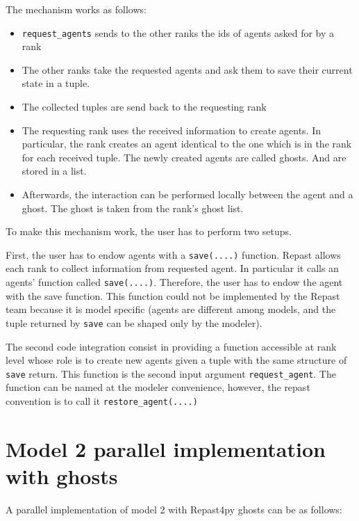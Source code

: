 \documentclass{article}
\providecommand{\tightlist}{%
  \setlength{\itemsep}{0pt}\setlength{\parskip}{0pt}}
\begin{document}
The mechanism works as follows:

\begin{itemize}
	\tightlist
	\item 
\verb+request_agents+ sends to the other ranks the ids of agents asked for by a rank
	\item 
The other ranks take the requested agents and ask them to save their current state in a tuple.
	\item 
The collected tuples are send back to the requesting rank
	\item 
		The requesting rank uses the received information to create agents. In particular, the rank creates an agent identical to the one which is in the rank for each received tuple. The newly created agents are called ghosts. And are stored in a list.
	\item 
		Afterwards, the interaction can be performed locally between the agent and a ghost. The ghost is taken from the rank's ghost list.
\end{itemize}

To make this mechanism work, the user has to perform two setups.

First, the user has to endow agents with a \verb+save(....)+ function.
Repast allows each rank to collect information from requested agent. In particular it calls an agents' function called \verb+save(....)+.
Therefore, the user has to endow the agent with the save function. This function could not be implemented by the Repast team because it is model specific (agents are different among models, and the tuple returned by \verb+save+ can be shaped only by the modeler).

The second code integration consist in providing a function accessible at rank level whose role is to create new agents given a tuple with the same structure of \verb+save+ return. This function is the second input argument \verb+request_agent+. The function can be named at the modeler convenience, however, the repast convention is to call it \verb+restore_agent(....)+   


\section{Model 2 parallel implementation with ghosts}
A parallel implementation of model 2 with Repast4py ghosts can be as follows:
\end{document}
